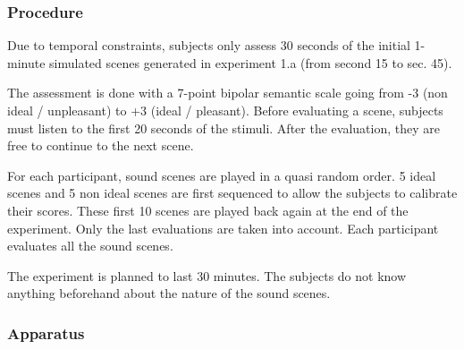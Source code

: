 \documentclass[12pt]{elsarticle}
\begin{document}
\subsubsection*{Procedure}


Due to temporal constraints, subjects only assess 30 seconds of the initial 1-minute simulated scenes generated in experiment 1.a (from second 15 to sec. 45).


The assessment is done with a 7-point bipolar semantic scale going from -3 (non ideal / unpleasant) to +3 (ideal / pleasant). Before evaluating a scene, subjects must listen to the first 20 seconds of the stimuli. After the evaluation, they are free to continue to the next scene.


For each participant, sound scenes are played in a quasi random order. 5 ideal scenes and 5 non ideal scenes are first sequenced to allow the subjects to calibrate their scores. These first 10 scenes are played back again at the end of the experiment. Only the last evaluations are taken into account. Each participant evaluates all the sound scenes.


The experiment is planned to last 30 minutes. The subjects do not know anything beforehand about the nature of the sound scenes.

\subsubsection*{Apparatus}
\end{document}
